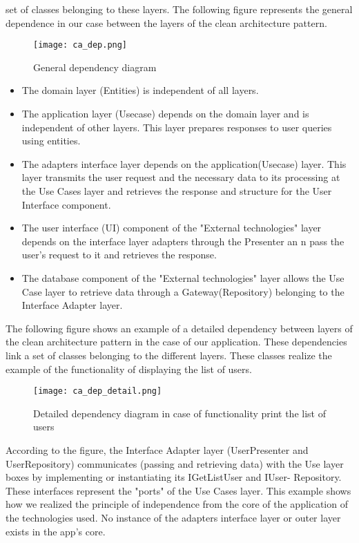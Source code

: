 set of classes belonging to these layers.
The following figure represents the general dependence in our case between the
layers of the clean architecture pattern.
\begin{figure}[H]%
    \center   
    \texttt{[image: ca\_dep.png]}
    \caption{General dependency diagram}
\end{figure}
\begin{itemize}
\item The domain layer (Entities) is independent of all layers.
\item The application layer (Usecase) depends on the domain layer and is independent of other layers. This layer prepares responses to
user queries using entities.
\item The adapters interface layer depends on the application(Usecase) layer.
This layer transmits the user request and the necessary data
to its processing at the Use Cases layer and retrieves the response and structure
for the User Interface component.
\item The user interface (UI) component of the "External technologies" layer
depends on the interface layer adapters through the Presenter an n
pass the user's request to it and retrieves the response.
\item The database component of the "External technologies" layer
allows the Use Case layer to retrieve data through a
Gateway(Repository) belonging to the Interface Adapter layer.

\end{itemize}
The following figure shows an example of a detailed dependency between
layers of the clean architecture pattern in the case of our application. These dependencies link a set of classes belonging to the different layers.
These classes realize the example of the functionality of displaying the list of
users.
\begin{figure}[H]%
    \center   
    \texttt{[image: ca\_dep\_detail.png]}
    \caption{Detailed dependency diagram in case of functionality
print the list of users}
\end{figure}
According to the figure, the Interface Adapter layer (UserPresenter and UserRepository)
communicates (passing and retrieving data) with the Use layer
boxes by implementing or instantiating its IGetListUser and IUser-
Repository. These interfaces represent the "ports" of the Use Cases layer.
This example shows how we realized the principle of independence
from the core of the application of the technologies used. No instance of the
adapters interface layer or outer layer exists in the app's core.
